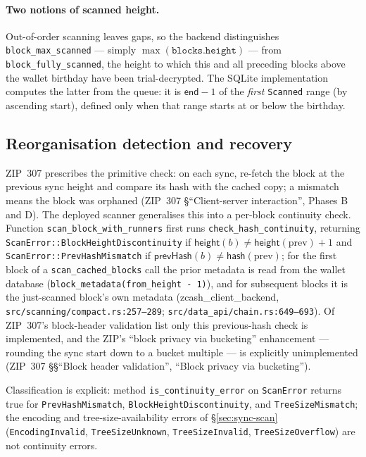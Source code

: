 \documentclass[11pt,a4paper]{article}
\theoremstyle{definition}
\begin{document}
\paragraph{Two notions of scanned height.} Out-of-order scanning leaves
gaps, so the backend distinguishes \texttt{block\_max\_scanned} --- simply
$\max(\texttt{blocks.height})$ --- from \texttt{block\_fully\_scanned}, the
height to which this and all preceding blocks above the wallet birthday
have been trial-decrypted. The SQLite implementation computes the latter
from the queue: it is $\mathsf{end} - 1$ of the \emph{first}
\texttt{Scanned} range (by ascending start), defined only when that range
starts at or below the birthday.

\subsection{Reorganisation detection and recovery}\label{sec:sync-reorg}

ZIP~307 prescribes the primitive check: on each sync, re-fetch the block at
the previous sync height and compare its hash with the cached copy; a
mismatch means the block was orphaned (ZIP~307 \S``Client-server
interaction'', Phases B and D). The
deployed scanner generalises this into a per-block continuity check.
Function \texttt{scan\_block\_with\_runners} first runs
\texttt{check\_hash\_continuity}, returning
\texttt{ScanError::BlockHeightDiscontinuity} if
$\mathsf{height}(b) \ne \mathsf{height}(\mathrm{prev}) + 1$ and
\texttt{ScanError::PrevHashMismatch} if
$\mathsf{prevHash}(b) \ne \mathsf{hash}(\mathrm{prev})$; for the first
block of a \texttt{scan\_cached\_blocks} call the prior metadata is read
from the wallet database (\texttt{block\_metadata(from\_height - 1)}), and
for subsequent blocks it is the just-scanned block's own metadata
(\textsf{zcash\_client\_backend}, \texttt{src/scanning/compact.rs:257--289};
\texttt{src/data\_api/chain.rs:649--693}). Of ZIP~307's block-header
validation list only this previous-hash check is implemented, and the
ZIP's ``block privacy via bucketing'' enhancement --- rounding the sync
start down to a bucket multiple --- is explicitly unimplemented
(ZIP~307 \S\S``Block header validation'', ``Block privacy via
bucketing'').

Classification is explicit: method \texttt{is\_continuity\_error} on
\texttt{ScanError} returns true for \texttt{PrevHashMismatch},
\texttt{BlockHeightDiscontinuity}, and \texttt{TreeSizeMismatch}; the
encoding and tree-size-availability errors of \S\ref{sec:sync-scan}
(\texttt{EncodingInvalid}, \texttt{TreeSizeUnknown},
\texttt{TreeSizeInvalid}, \texttt{TreeSizeOverflow}) are not continuity
errors.
\end{document}
